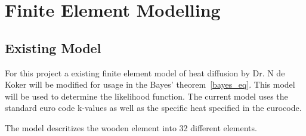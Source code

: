 \chapter{Finite Element Modelling}
\section{Existing Model}
	For this project a existing finite element model of heat diffusion by Dr. N de Koker will be modified for usage in the Bayes' theorem~\ref{bayes_eq}. This model will be used to determine the likelihood function. The current model uses the standard euro code k-values as well as the specific heat specified in the eurocode. 
	
	The model descritizes the wooden element into 32 different elements.
	
	